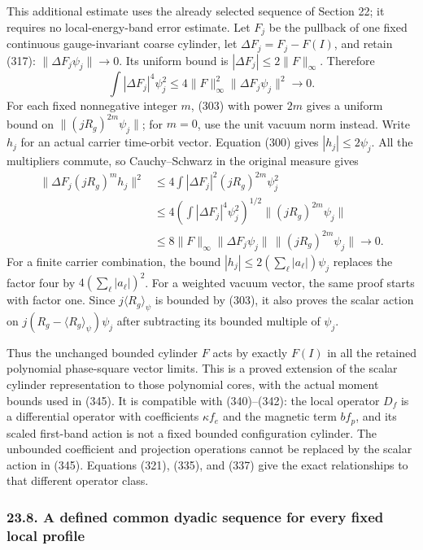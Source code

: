 \documentclass[
  11pt,
]{article}
\begin{document}
This additional estimate uses the already selected sequence of Section
22; it requires no local-energy-band error estimate. Let \(F_j\) be the
pullback of one fixed continuous gauge-invariant coarse cylinder, let
\(\Delta F_j=F_j-F(I)\), and retain (317): \(\|\Delta F_j\psi_j\|\to0\).
Its uniform bound is \(|\Delta F_j|\le2\|F\|_\infty\). Therefore \[
 \int|\Delta F_j|^4\psi_j^2
 \le4\|F\|_\infty^2\|\Delta F_j\psi_j\|^2\longrightarrow0.
 \tag{344}
\] For each fixed nonnegative integer \(m\), (303) with power \(2m\)
gives a uniform bound on \(\|(jR_g)^{2m}\psi_j\|\); for \(m=0\), use the
unit vacuum norm instead. Write \(h_j\) for an actual carrier time-orbit
vector. Equation (300) gives \(|h_j|\le2\psi_j\). All the multipliers
commute, so Cauchy--Schwarz in the original measure gives \[
 \begin{split}
 \|\Delta F_j(jR_g)^m h_j\|^2
 &\le4\int|\Delta F_j|^2(jR_g)^{2m}\psi_j^2\\
 &\le4\left(\int|\Delta F_j|^4\psi_j^2\right)^{1/2}
               \|(jR_g)^{2m}\psi_j\|\\
 &\le8\|F\|_\infty\|\Delta F_j\psi_j\|\,
               \|(jR_g)^{2m}\psi_j\|\longrightarrow0.
 \end{split}
 \tag{345}
\] For a finite carrier combination, the bound
\(|h_j|\le2(\sum_\ell|a_\ell|)\psi_j\) replaces the factor four by
\(4(\sum_\ell|a_\ell|)^2\). For a weighted vacuum vector, the same proof
starts with factor one. Since \(j\langle R_g\rangle_\psi\) is bounded by
(303), it also proves the scalar action on
\(j(R_g-\langle R_g\rangle_\psi)\psi_j\) after subtracting its bounded
multiple of \(\psi_j\).

Thus the unchanged bounded cylinder \(F\) acts by exactly \(F(I)\) in
all the retained polynomial phase-square vector limits. This is a proved
extension of the scalar cylinder representation to those polynomial
cores, with the actual moment bounds used in (345). It is compatible
with (340)--(342): the local operator \(D_f\) is a differential operator
with coefficients \(\kappa f_e\) and the magnetic term \(bf_p\), and its
scaled first-band action is not a fixed bounded configuration cylinder.
The unbounded coefficient and projection operations cannot be replaced
by the scalar action in (345). Equations (321), (335), and (337) give
the exact relationships to that different operator class.

\subsubsection{23.8. A defined common dyadic sequence for every fixed
local
profile}\label{a-defined-common-dyadic-sequence-for-every-fixed-local-profile}
\end{document}
